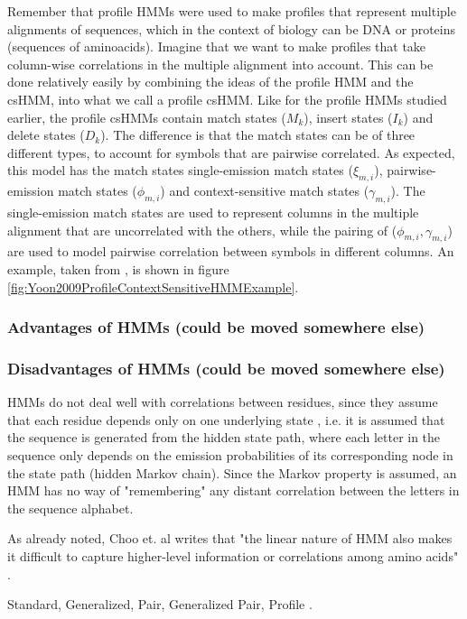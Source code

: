 \documentclass{article}
\begin{document}
Remember that profile HMMs were used to make profiles that represent multiple alignments of sequences, which in the context of biology can be DNA or proteins (sequences of aminoacids). Imagine that we want to make profiles that take column-wise correlations in the multiple alignment into account. This can be done relatively easily by combining the ideas of the profile HMM and the csHMM, into what we call a profile csHMM. Like for the profile HMMs studied earlier, the profile csHMMs contain match states ($M_k$), insert states ($I_k$) and delete states ($D_k$). The difference is that the match states can be of three different types, to account for symbols that are pairwise correlated. As expected, this model has the match states single-emission match states ($\xi_{m,i}$),  pairwise-emission match states ($\phi_{m,i}$) and context-sensitive match states ($\gamma_{m,i}$). The single-emission match states are used to represent columns in the multiple alignment that are uncorrelated with the others, while the pairing of ($\phi_{m,i}, \gamma_{m,i}$) are used to model pairwise correlation between symbols in different columns. An example, taken from \cite{Yoon2009}, is shown in figure \ref{fig:Yoon2009ProfileContextSensitiveHMMExample}.


\subsubsection{Advantages of HMMs (could be moved somewhere else)}

\subsubsection{Disadvantages of HMMs (could be moved somewhere else)}
HMMs do not deal well with correlations between residues, since they assume that each residue depends only on one underlying state \cite{Eddy04}, i.e. it is assumed that the sequence is generated from the hidden state path, where each letter in the sequence only depends on the emission probabilities of its corresponding node in the state path (hidden Markov chain). Since the Markov property is assumed, an HMM has no way of "remembering" any distant correlation between the letters in the sequence alphabet. 

As already noted, Choo et. al writes that "the linear nature of HMM also makes it difficult to capture higher-level information or correlations among amino acids" \cite{Choo2004}.

Standard, Generalized, Pair, Generalized Pair, Profile \cite{Choo2004}.
\end{document}

